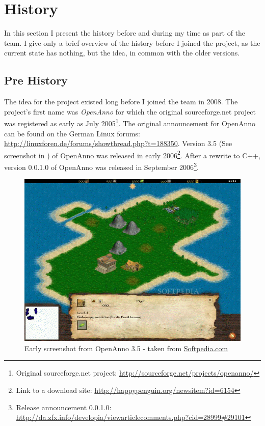 \section{History}
In this section I present the history before and during my time as part of the \UH{} team. I give only a brief
overview of the history before I joined the project, as the current state has nothing, but the idea, in common with the
older versions.

\subsection{Pre History}
The idea for the \UH{} project existed long before I joined the team in 2008. The project's first name was \textit{OpenAnno}
for which the original sourceforge.net project was registered as early as July 2005\footnote{Original sourceforge.net
project: \url{http://sourceforge.net/projects/openanno/}}. The original announcement for OpenAnno can be found on the
German Linux forums: \url{http://linuxforen.de/forums/showthread.php?t=188350}. Version 3.5 (See screenshot in ) of OpenAnno was released in
early 2006\footnote{Link to a download site: \url{http://happypenguin.org/newsitem?id=6154}}. After a rewrite to C++,
version 0.0.1.0 of OpenAnno was released in September 2006\footnote{Release announcement 0.0.1.0:
\url{http://da.zfx.info/developia/viewarticlecomments.php?cid=28999\#29101}}. 

\begin{figure}[!htb]
	\begin{center}
		\includegraphics[scale=0.50]{pics/openannoscreenshot}
	\end{center}
    \caption{Early screenshot from OpenAnno 3.5 - taken from
    \href{http://mac.softpedia.com/progScreenshots/OpenAnno-Screenshot-13550.html}{Softpedia.com}}
    \label{oascreenshot}
\end{figure}

